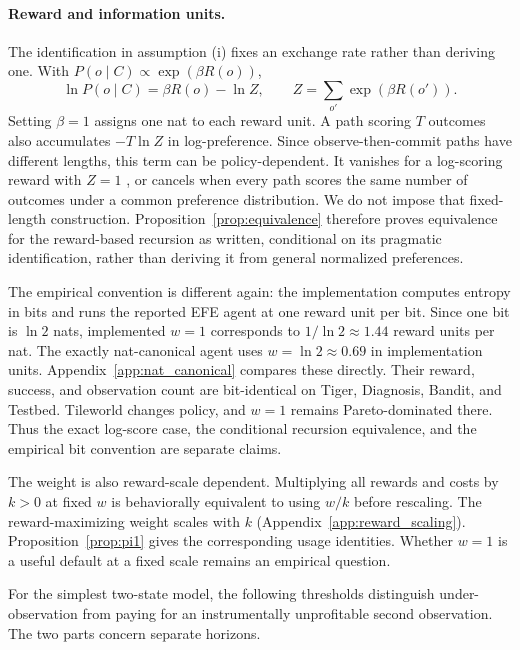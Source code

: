 \paragraph{Reward and information units.}
The identification in assumption (i) fixes an exchange rate rather than deriving one. With $P(o\mid C)\propto\exp(\beta R(o))$,
\[
\ln P(o\mid C)=\beta R(o)-\ln Z,\qquad Z=\sum_{o'}\exp(\beta R(o')).
\]
Setting $\beta=1$ assigns one nat to each reward unit. A path scoring $T$ outcomes also accumulates $-T\ln Z$ in log-preference. Since observe-then-commit paths have different lengths, this term can be policy-dependent. It vanishes for a log-scoring reward with $Z=1$ \citep{bernardo1979}, or cancels when every path scores the same number of outcomes under a common preference distribution. We do not impose that fixed-length construction. Proposition~\ref{prop:equivalence} therefore proves equivalence for the reward-based recursion as written, conditional on its pragmatic identification, rather than deriving it from general normalized preferences.

The empirical convention is different again: the implementation computes entropy in bits and runs the reported EFE agent at one reward unit per bit. Since one bit is $\ln 2$ nats, implemented $w=1$ corresponds to $1/\ln 2\approx1.44$ reward units per nat. The exactly nat-canonical agent uses $w=\ln 2\approx0.69$ in implementation units. Appendix~\ref{app:nat_canonical} compares these directly. Their reward, success, and observation count are bit-identical on Tiger, Diagnosis, Bandit, and Testbed. Tileworld changes policy, and $w=1$ remains Pareto-dominated there. Thus the exact log-score case, the conditional recursion equivalence, and the empirical bit convention are separate claims.

The weight is also reward-scale dependent. Multiplying all rewards and costs by $k>0$ at fixed $w$ is behaviorally equivalent to using $w/k$ before rescaling. The reward-maximizing weight scales with $k$ (Appendix~\ref{app:reward_scaling}). Proposition~\ref{prop:pi1} gives the corresponding usage identities. Whether $w=1$ is a useful default at a fixed scale remains an empirical question.

For the simplest two-state model, the following thresholds distinguish under-observation from paying for an instrumentally unprofitable second observation. The two parts concern separate horizons.

